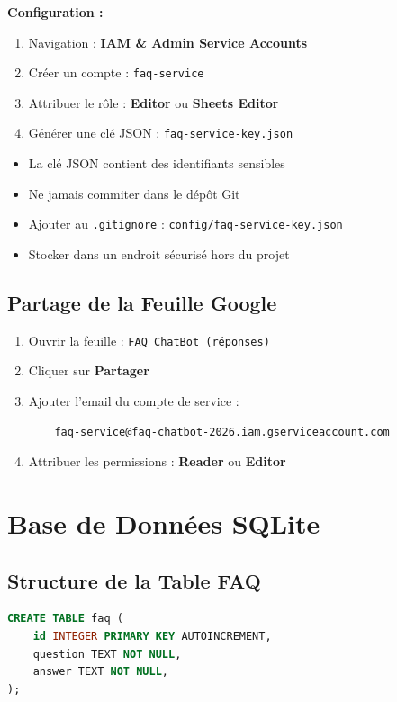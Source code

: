 \documentclass[11pt,a4paper]{article}
\begin{document}
\textbf{Configuration :}
\begin{enumerate}
    \item Navigation : \textbf{IAM \& Admin \to Service Accounts}
    \item Créer un compte : \texttt{faq-service}
    \item Attribuer le rôle : \textbf{Editor} ou \textbf{Sheets Editor}
    \item Générer une clé JSON : \texttt{faq-service-key.json}
\end{enumerate}

\begin{important}
\begin{itemize}
    \item La clé JSON contient des identifiants sensibles
    \item Ne jamais commiter dans le dépôt Git
    \item Ajouter au \texttt{.gitignore} : \texttt{config/faq-service-key.json}
    \item Stocker dans un endroit sécurisé hors du projet
\end{itemize}
\end{important}

\subsection{Partage de la Feuille Google}
\begin{enumerate}
    \item Ouvrir la feuille : \texttt{FAQ ChatBot (réponses)}
    \item Cliquer sur \textbf{Partager}
    \item Ajouter l'email du compte de service :
    \begin{verbatim}
    faq-service@faq-chatbot-2026.iam.gserviceaccount.com
    \end{verbatim}
    \item Attribuer les permissions : \textbf{Reader} ou \textbf{Editor}
\end{enumerate}

\section{Base de Données SQLite}
\label{sec:database}

\subsection{Structure de la Table FAQ}
\begin{lstlisting}[language=SQL]
CREATE TABLE faq (
    id INTEGER PRIMARY KEY AUTOINCREMENT,
    question TEXT NOT NULL,
    answer TEXT NOT NULL,
);
\end{lstlisting}
\end{document}
